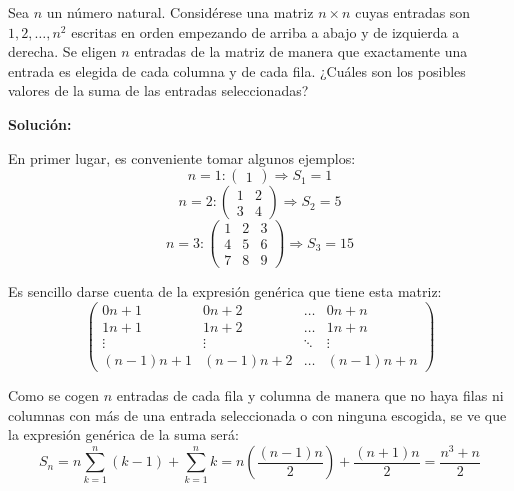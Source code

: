 \documentclass[../../main.tex]{subfiles}
\begin{document}
  \begin{shaded}
    Sea $n$ un número natural. Considérese una matriz $n \times n$ cuyas entradas son $1, 2, \dots, n^2$ escritas en orden empezando de arriba a abajo y de izquierda a derecha. Se eligen $n$ entradas de la matriz de manera que exactamente una entrada es elegida de cada columna y de cada fila. ¿Cuáles son los posibles valores de la suma de las entradas seleccionadas?
  \end{shaded}

  \textbf{Solución:}

  En primer lugar, es conveniente tomar algunos ejemplos:
  $$
  n = 1:
    \begin{pmatrix}
      1
    \end{pmatrix}
  \Longrightarrow S_1 = 1
  $$
  $$
  n = 2:
    \begin{pmatrix}
      1 & 2 \\
      3 & 4
    \end{pmatrix}
  \Longrightarrow S_2 = 5
  $$
  $$
  n = 3:
    \begin{pmatrix}
      1 & 2 & 3 \\
      4 & 5 & 6 \\
      7 & 8 & 9
    \end{pmatrix}
  \Longrightarrow S_3 = 15
  $$

  Es sencillo darse cuenta de la expresión genérica que tiene esta matriz:
  $$
  \begin{pmatrix}
    0n + 1        & 0n + 2        & \dots  & 0n + n        \\
    1n + 1        & 1n + 2        & \dots  & 1n + n        \\
    \vdots        & \vdots        & \ddots & \vdots        \\
    (n - 1) n + 1 & (n - 1) n + 2 & \dots  & (n - 1) n + n
  \end{pmatrix}
  $$

  Como se cogen $n$ entradas de cada fila y columna de manera que no haya filas ni columnas con más de una entrada seleccionada o con ninguna escogida, se ve que la expresión genérica de la suma será:
  $$
  S_n = n \sum_{k = 1}^n (k - 1) + \sum_{k = 1}^n k = n \left(\frac{(n - 1) n}{2}\right) + \frac{(n + 1) n}{2} = \frac{n^3 + n}{2}
  $$
\end{document}
